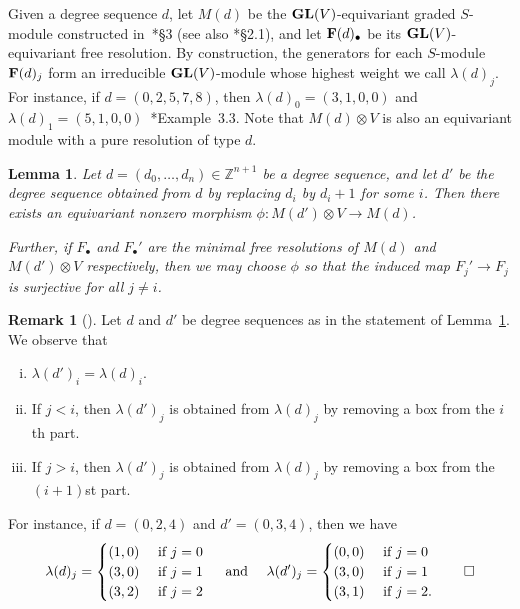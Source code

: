 \documentclass[12pt]{amsart}
\newtheorem{lemma}[equation]{Lemma}
\theoremstyle{definition}
\newtheorem{rmk}[equation]{Remark}
\newenvironment{remark}[1][]{\begin{rmk}[#1] \pushQED{\qed}}{\popQED \end{rmk}}
\newcommand{\ZZ}{\mathbb{Z}}
\newcommand{\GL}{{\bf GL}}
\begin{document}
Given a degree sequence $d$, let $M(d)$ be the $\GL(V)$-equivariant
graded $S$-module constructed in~\cite{efw}*{\S3} (see also
\cite{sam}*{\S2.1}), and let ${\bf F}(d)_\bullet$ be its
$\GL(V)$-equivariant free resolution. By construction, the generators
for each $S$-module ${\bf F}(d)_j$ form an irreducible $\GL(V)$-module
whose highest weight we call $\lambda(d)_j$.  For instance, if
$d=(0,2,5,7,8)$, then $\lambda(d)_0=(3,1,0,0)$ and
$\lambda(d)_1=(5,1,0,0)$~\cite{efw}*{Example~3.3}.  Note that
$M(d)\otimes V$ is also an equivariant module with a pure resolution
of type $d$.
  
\begin{lemma} 
\label{lemma:eqvtmodules} 
Let $d = (d_0, \dots, d_n) \in \ZZ^{n+1}$ be a degree sequence, and
let $d'$ be the degree sequence obtained from $d$ by replacing $d_i$
by $d_i+1$ for some $i$. Then there exists an equivariant nonzero morphism 
$\phi \colon M(d')\otimes V\to M(d)$.

Further, if $F_\bullet$ and $F_\bullet'$ are the minimal free resolutions of $M(d)$ and $M(d')\otimes V$ respectively,
then we may choose $\phi$ so that the induced map $F_j'\to F_j$ is surjective for all $j\ne i$.
\end{lemma}

\begin{remark} \label{remark:eqvtefw} Let $d$ and $d'$ be degree sequences
as in the statement of Lemma~\ref{lemma:eqvtmodules}.  We observe that 
  \begin{enumerate}[(i)]
  \item $\lambda(d')_i = \lambda(d)_i$.
  \item If $j < i$, then $\lambda(d')_j$ is obtained from
    $\lambda(d)_j$ by removing a box from the $i$th part.
  \item If $j > i$, then $\lambda(d')_j$ is obtained from
    $\lambda(d)_j$ by removing a box from the $(i+1)$st part.
  \end{enumerate}
For instance, if $d=(0,2,4)$ and $d'=(0,3,4)$, then we have 
\[
\lambda(d)_j=\begin{cases}
(1,0) & \text{ if } j=0\\
(3,0) & \text{ if } j=1\\
(3,2) & \text{ if } j=2
\end{cases}
\quad \text{ and } \quad
\lambda(d')_j=\begin{cases}
(0,0) & \text{ if } j=0\\
(3,0) & \text{ if } j=1\\
(3,1) & \text{ if } j=2.
\end{cases} \qedhere
\]
\end{remark}
\end{document}
